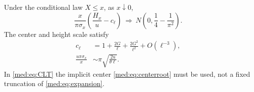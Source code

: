 \begin{theorem}
\label{med:thm:height}
Under the conditional law $X\le x$, as $x\downarrow0$,
\begin{equation}\label{med:eq:CLT}
 \boxed{\quad
 \frac{x}{\pi\sigma_x}\left(\frac{H_x}{u}-c_\ell\right)
 \ \Longrightarrow\
 N\left(0,\frac14-\frac1{\pi^2}\right).
 \quad}
\end{equation}
The center and height scale satisfy
\begin{align}
 c_\ell&=1+\frac{2G}{\ell}+\frac{2G^2}{\ell^2}
                            +O(\ell^{-3}),\label{med:eq:expansion}\\
 \frac{u\pi\sigma_x}{x}
       &\sim\pi\sqrt{\frac{2u}{\theta\ell}}.
       \label{med:eq:heightscale}
\end{align}
In \eqref{med:eq:CLT} the implicit center \eqref{med:eq:centerroot}
must be used, not a fixed truncation of \eqref{med:eq:expansion}.
\end{theorem}

